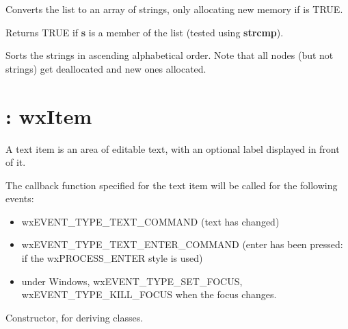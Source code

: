 

Converts the list to an array of strings, only allocating new memory if
 is TRUE.



Returns TRUE if {\bf s} is a member of the list (tested using {\bf strcmp}).



Sorts the strings in ascending alphabetical order. Note that all nodes
(but not strings) get deallocated and new ones allocated.

\section{: wxItem}\label{wxtext}

A text item is an area of editable text, with an optional label
displayed in front of it.

The callback function specified for the text item will be called
for the following events:

\begin{itemize}\itemsep=0pt
\item wxEVENT\_TYPE\_TEXT\_COMMAND (text has changed)
\item wxEVENT\_TYPE\_TEXT\_ENTER\_COMMAND (enter has been pressed:
if the wxPROCESS\_ENTER style is used)
\item under Windows, wxEVENT\_TYPE\_SET\_FOCUS, wxEVENT\_TYPE\_KILL\_FOCUS when
the focus changes.
\end{itemize}

\label{constrtext}


Constructor, for deriving classes.


